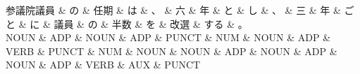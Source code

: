\documentclass[tikz,border=5pt]{standalone}
\begin{document}
\normalsize
\begin{dependency}[edge unit distance=12.0pt]
    \begin{deptext}[column sep=1em]
        参議院議員 \& の \& 任期 \& は \& 、 \& 六 \& 年 \& と \& し \& 、 \& 三 \& 年 \& ごと \& に \& 議員 \& の \& 半数 \& を \& 改選 \& する \& 。\\
        NOUN \& ADP \& NOUN \& ADP \& PUNCT \& NUM \& NOUN \& ADP \& VERB \& PUNCT \& NUM \& NOUN \& NOUN \& ADP \& NOUN \& ADP \& NOUN \& ADP \& VERB \& AUX \& PUNCT\\
    \end{deptext}
\end{dependency}
\end{document}
